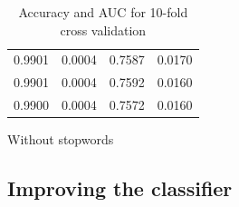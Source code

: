 \begin{table}
\begin{subtable}{.5\linewidth}
\begin{tabular}{cccc}
      0.9901          & 0.0004        & 0.7587          & 0.0170 \\
      0.9901          & 0.0004        & 0.7592          & 0.0160 \\
      0.9900          & 0.0004        & 0.7572          & 0.0160 \\ \bottomrule
    \end{tabular}
      \caption{Without stopwords}
      \label{tab:data-without-stopwords}
  \end{subtable}
\caption{Accuracy and AUC for 10-fold cross validation}
\label{tab:with-without-stopwords-data-tables}
\end{table}



\subsection{Improving the classifier}
